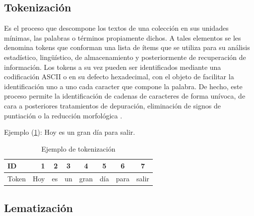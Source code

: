 
\subsection{Tokenización}

Es el proceso que descompone los textos de una colección en sus unidades mínimas, las palabras
o términos propiamente dichos. A tales elementos se les denomina tokens que conforman una lista de
ítems que se utiliza para su análisis estadístico, ling{\"u}ístico, de almacenamiento y posteriormente de
recuperación de información. Los tokens a su vez pueden ser identificados mediante una codificación
ASCII o en su defecto hexadecimal, con el objeto de facilitar la identificación uno a uno cada caracter
que compone la palabra. De hecho, este proceso permite la identificación de cadenas de caracteres de
forma unívoca, de cara a posteriores tratamientos de depuración, eliminación de signos de puntiación
o la reducción morfológica \citep{CT12}.

Ejemplo  (\ref{tabla:sencilla}): Hoy es un gran día para salir.

\begin{table}[htbp]
	\begin{center}
	\begin{tabular}{|l|r|r|c|c|c|c|c|}
		\hline
		ID & 1 & 2 & 3 & 4 & 5 & 6 & 7 \\ 
		\hline
		Token & Hoy & es & un & gran & día & para & salir \\ \hline
		\hline
	\end{tabular}
	\caption{Ejemplo de tokenización}
	\label{tabla:sencilla}
	\end{center}
	
\end{table}


\subsection{Lematización}


